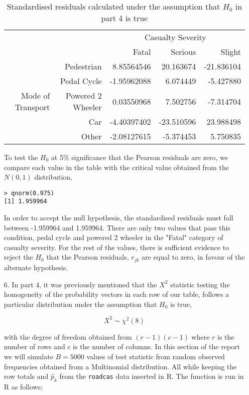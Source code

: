 \documentclass[11pt,a4]{article}
\begin{document}
\begin{enumerate}
\begin{table}[ht]
\centering
\begin{tabular}{rr|rrr}
    \multicolumn{2}{c}{\multirow{2}{*}{}}&\multicolumn{3}{|c}{Casualty Severity} \\
    \multicolumn{2}{c|}{}& Fatal & Serious & Slight\\
  \hline
  \multirow{5}{*}{Mode of Transport} & Pedestrian & 8.85564546 & 20.163674 & -21.836104\\ 
  & Pedal Cycle &  -1.95962088 & 6.074449 & -5.427880 \\ 
  & Powered 2 Wheeler & 0.03550968 & 7.502756 & -7.314704 \\ 
  & Car & -4.40397402 & -23.510596 & 23.988498 \\ 
  & Other & -2.08127615 & -5.374453 & 5.750835 \\ 
   \hline
\end{tabular}
\caption{Standardised residuals calculated under the assumption that $H_{0}$ in part 4 is true}
\label{tab6}
\end{table}

To test the $H_{0}$ at 5\% significance that the Pearson residuals are zero, we compare each value in the table with the critical value obtained from the $N(0,1)$ distribution,

\begin{verbatim}
> qnorm(0.975)
[1] 1.959964
\end{verbatim}
 
In order to accept the null hypothesis, the standardised residuals must fall between -1.959964 and 1.959964. There are only two values that pass this condition, pedal cycle and powered 2 wheeler in the "Fatal" category of casualty severity. For the rest of the values, there is sufficient evidence to  reject the $H_{0}$ that the Pearson residuals, $r_{jk}$ are equal to zero, in favour of the alternate hypothesis. 

\item [6.]
In part 4, it was previously mentioned that the $X^2$ statistic testing the homogeneity of the probability vectors in each row of our table, follows a particular distribution under the assumption that $H_{0}$ is true,

\[ X^2 \sim {\chi}^2 (8)\]

with the degree of freedom obtained from $(r-1)(c-1)$ where $r$ is the number of rows and $c$ is the number of columns. In this section of the report we will simulate $B=5000$ values of test statistic from random observed frequencies obtained from a Multinomial distribution. All while keeping the row totals and $\hat{p}_{k}$ from the \verb|roadcas| data inserted in R. The function is run in R as follows;


\end{enumerate}
\end{document}
